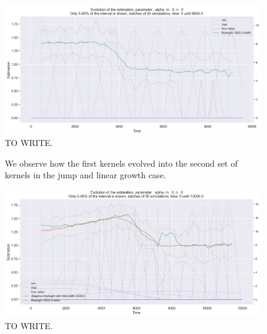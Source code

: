 \begin{figure}
\centering
\includegraphics[width = 0.90 \textwidth]{../imag/chap3/2/Figure_2.png}
\caption{TO WRITE.}
\label{fig:first_estimate_2_nu}
\end{figure}



















\begin{figure}
\centering
{} 
\caption{We observe how the first kernels evolved into the second set of kernels in the jump and linear growth case.}
\label{fig:compar_kernels_3}
\end{figure}

\begin{figure}
\centering
\includegraphics[width = 0.90 \textwidth]{../imag/chap3/3/J.png}
\caption{TO WRITE.}
\label{fig:first_estimate_3_alpha}
\end{figure}

